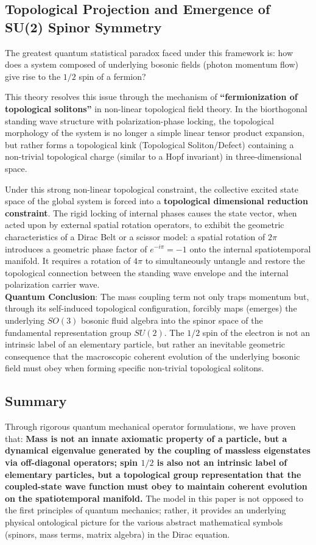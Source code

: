 \documentclass[12pt, a4paper]{article}
\begin{document}
\subsection{Topological Projection and Emergence of SU(2) Spinor Symmetry}

The greatest quantum statistical paradox faced under this framework is: how does a system composed of underlying bosonic fields (photon momentum flow) give rise to the $1/2$ spin of a fermion?

This theory resolves this issue through the mechanism of \textbf{``fermionization of topological solitons''} in non-linear topological field theory. In the biorthogonal standing wave structure with polarization-phase locking, the topological morphology of the system is no longer a simple linear tensor product expansion, but rather forms a topological kink (Topological Soliton/Defect) containing a non-trivial topological charge (similar to a Hopf invariant) in three-dimensional space.

Under this strong non-linear topological constraint, the collective excited state space of the global system is forced into a \textbf{topological dimensional reduction constraint}. The rigid locking of internal phases causes the state vector, when acted upon by external spatial rotation operators, to exhibit the geometric characteristics of a Dirac Belt or a scissor model: a spatial rotation of $2\pi$ introduces a geometric phase factor of $e^{-i\pi} = -1$ onto the internal spatiotemporal manifold. It requires a rotation of $4\pi$ to simultaneously untangle and restore the topological connection between the standing wave envelope and the internal polarization carrier wave. \\
\textbf{Quantum Conclusion}: The mass coupling term not only traps momentum but, through its self-induced topological configuration, forcibly maps (emerges) the underlying $SO(3)$ bosonic fluid algebra into the spinor space of the fundamental representation group $SU(2)$. The $1/2$ spin of the electron is not an intrinsic label of an elementary particle, but rather an inevitable geometric consequence that the macroscopic coherent evolution of the underlying bosonic field must obey when forming specific non-trivial topological solitons.

\subsection{Summary}

Through rigorous quantum mechanical operator formulations, we have proven that: \textbf{Mass is not an innate axiomatic property of a particle, but a dynamical eigenvalue generated by the coupling of massless eigenstates via off-diagonal operators; spin $1/2$ is also not an intrinsic label of elementary particles, but a topological group representation that the coupled-state wave function must obey to maintain coherent evolution on the spatiotemporal manifold.} The model in this paper is not opposed to the first principles of quantum mechanics; rather, it provides an underlying physical ontological picture for the various abstract mathematical symbols (spinors, mass terms, matrix algebra) in the Dirac equation.
\end{document}

